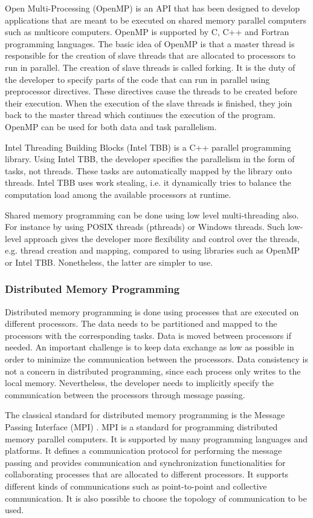 Open Multi-Processing (OpenMP) \cite{openmp} is an API that has been designed to develop applications that are meant to be executed on shared memory parallel computers such as multicore computers. OpenMP is supported by C, C++ and Fortran programming languages. The basic idea of OpenMP is that a master thread is responsible for the creation of slave threads that are allocated to processors to run in parallel. The creation of slave threads is called forking. It is the duty of the developer to specify parts of the code that can run in parallel using preprocessor directives. These directives cause the threads to be created before their execution. When the execution of the slave threads is finished, they join back to the master thread which continues the execution of the program. OpenMP can be used for both data and task parallelism.

Intel Threading Building Blocks (Intel TBB) is a C++ parallel programming library. Using Intel TBB, the developer specifies the parallelism in the form of tasks, not threads. These tasks are automatically mapped by the library onto threads. Intel TBB uses work stealing, i.e. it dynamically tries to balance the computation load among the available processors at runtime.

Shared memory programming can be done using low level multi-threading also. For instance by using POSIX threads (pthreads) or Windows threads. Such low-level approach gives the developer more flexibility and control over the threads, e.g. thread creation and mapping, compared to using libraries such as OpenMP or Intel TBB. Nonetheless, the latter are simpler to use. 

\subsubsection{Distributed Memory Programming}

Distributed memory programming is done using processes that are executed on different processors. The data needs to be partitioned and mapped to the processors with the corresponding tasks. Data is moved between processors if needed. An important challenge is to keep data exchange as low as possible in order to minimize the communication between the processors. Data consistency is not a concern in distributed programming, since each process only writes to the local memory. Nevertheless, the developer needs to implicitly specify the communication between the processors through message passing.  

The classical standard for distributed memory programming is the Message Passing Interface (MPI) \cite{mpi}. MPI is a standard for programming distributed memory parallel computers. It is supported by many programming languages and platforms. It defines a communication protocol for performing the message passing and provides communication and synchronization functionalities for collaborating processes that are allocated to different processors. It supports different kinds of communications such as point-to-point and collective communication. It is also possible to choose the topology of communication to be used.

